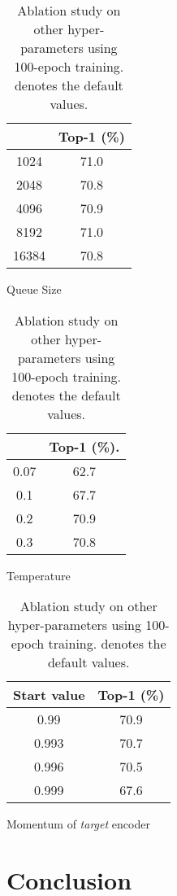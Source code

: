 \documentclass{article}
\begin{document}
\begin{table}[h]
  \begin{subtable}[h]{0.3\textwidth}
  \centering
  \begin{tabular}{cc}
    \toprule
     &  Top-1 (\%) \\
    \midrule
     1024 & 71.0 \\
     2048 & 70.8 \\
     4096 & 70.9 \\
     8192 & 71.0 \\
     16384 & 70.8 \\
    \bottomrule
  \end{tabular}
  \caption{Queue Size }
  \label{tab-ablation-queue}
  \end{subtable}
  \hfill
  \begin{subtable}[h]{0.3\textwidth}
  \centering
  \begin{tabular}{cc}
    \toprule
     &  Top-1 (\%). \\
    \midrule
     0.07 & 62.7 \\
     0.1 & 67.7 \\
     0.2 & 70.9 \\
     0.3 & 70.8 \\
    \bottomrule
  \end{tabular}
  \caption{Temperature }
  \label{tab-ablation-temp}
  \end{subtable}
  \hfill
  \begin{subtable}[h]{0.3\textwidth}
  \centering
  \begin{tabular}{cc}
    \toprule
    Start value &  Top-1 (\%) \\
    \midrule
     0.99 & 70.9 \\
     0.993 & 70.7 \\
     0.996 & 70.5 \\
     0.999 & 67.6 \\
    \bottomrule
  \end{tabular}
  \caption{Momentum of \emph{target} encoder}
  \label{tab-ablation-momentum}
  \end{subtable}
  \caption{Ablation study on other hyper-parameters using 100-epoch training.  denotes the default values.}
  \label{tab-ablation-hyper-params}
\end{table}

\section{Conclusion}
\end{document}
